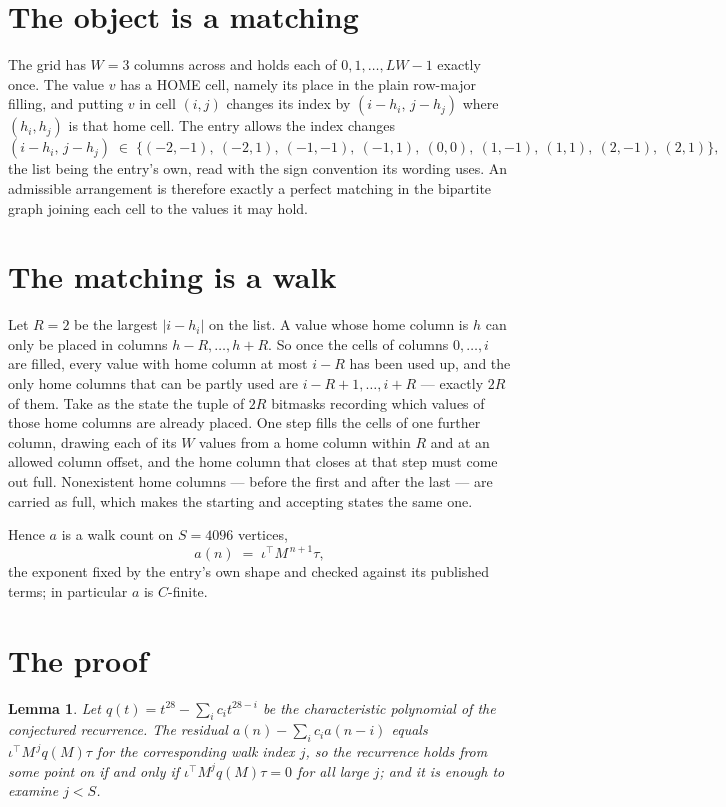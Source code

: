 \documentclass[11pt,a4paper]{article}
\theoremstyle{plain}
\newtheorem{lemma}[theorem]{Lemma}
\theoremstyle{definition}
\begin{document}
\section{The object is a matching}

The grid has $W=3$ columns across and holds each of $0,1,\dots,LW-1$ exactly once. The value
$v$ has a HOME cell, namely its place in the plain row-major filling, and putting $v$ in cell
$(i,j)$ changes its index by $(i-h_i,\,j-h_j)$ where $(h_i,h_j)$ is that home cell. The entry
allows the index changes
\[
(i-h_i,\,j-h_j)\;\in\;\{(-2,-1),\ (-2,1),\ (-1,-1),\ (-1,1),\ (0,0),\ (1,-1),\ (1,1),\ (2,-1),\ (2,1)\},
\]
the list being the entry's own, read with the sign convention its wording uses. An admissible
arrangement is therefore exactly a perfect matching in the bipartite graph joining each cell to
the values it may hold.

\section{The matching is a walk}

Let $R=2$ be the largest $|i-h_i|$ on the list. A value whose home column is $h$ can only be
placed in columns $h-R,\dots,h+R$. So once the cells of columns $0,\dots,i$ are filled, every
value with home column at most $i-R$ has been used up, and the only home columns that can be
partly used are $i-R+1,\dots,i+R$ --- exactly $2R$ of them. Take as the state the tuple of
$2R$ bitmasks recording which values of those home columns are already placed. One step fills
the cells of one further column, drawing each of its $W$ values from a home column within $R$
and at an allowed column offset, and the home column that closes at that step must come out
full. Nonexistent home columns --- before the first and after the last --- are carried as
full, which makes the starting and accepting states the same one.

Hence $a$ is a walk count on $S=4096$ vertices,
\[
a(n)\;=\;\iota^{\!\top}M^{\,n+1}\tau ,
\]
the exponent fixed by the entry's own shape and checked against its published terms; in
particular $a$ is $C$-finite.

\section{The proof}

\begin{lemma}\label{lem:crit}
Let $q(t)=t^{28}-\sum_i c_it^{28-i}$ be the characteristic polynomial of the
conjectured recurrence. The residual $a(n)-\sum_ic_ia(n-i)$ equals
$\iota^{\!\top}M^{\,j}q(M)\tau$ for the corresponding walk index $j$, so the recurrence
holds from some point on if and only if $\iota^{\!\top}M^{j}q(M)\tau=0$ for all large $j$;
and it is enough to examine $j<S$.
\end{lemma}
\end{document}
